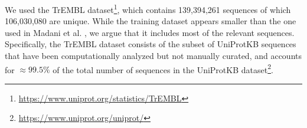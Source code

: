 \begin{table}[h]
\centering
\renewcommand{\arraystretch}{1.4}
\vspace{2mm}
\caption{Statistics for the TrEMBL single sequence and the long sequence task.}
\label{table-trembl-statistics}
\end{table}

We used the TrEMBL dataset\footnote{\url{https://www.uniprot.org/statistics/TrEMBL}}, which contains 139,394,261 sequences of which 106,030,080 are unique. While the training dataset appears smaller than the one used in Madani et al. \citep{progen}, we argue that it includes most of the relevant sequences. Specifically, the TrEMBL dataset consists of the subset of UniProtKB sequences that have been computationally analyzed but not manually curated, and accounts for $\approx99.5\%$ of the total number of sequences in the UniProtKB dataset\footnote{\url{https://www.uniprot.org/uniprot/}}.

